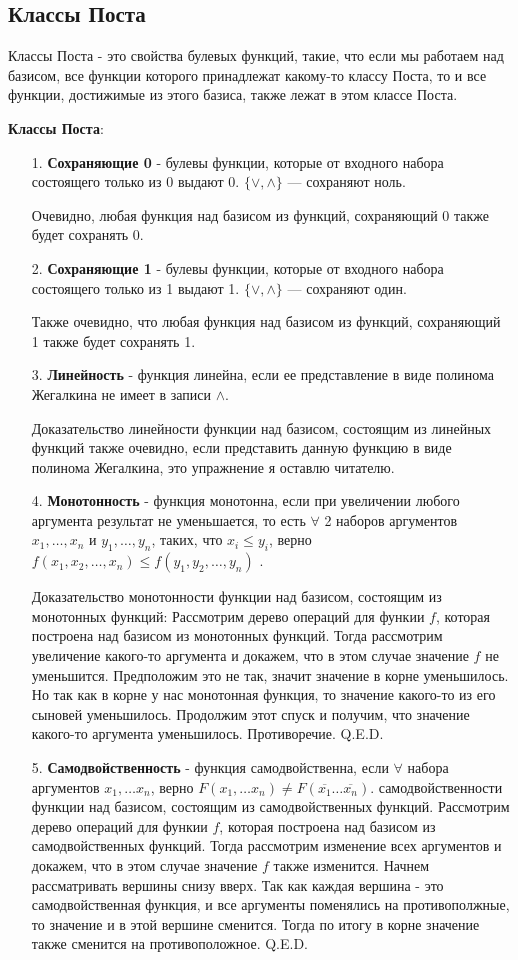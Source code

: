 \subsection{Классы Поста}
Классы Поста - это свойства булевых функций, такие, что если мы работаем над базисом, все функции которого принадлежат какому-то классу Поста, то и все функции, достижимые из этого базиса, также лежат в этом классе Поста.

\textbf{Классы Поста}:
\begin{enumerate}
    \item[1.] \textbf{Сохраняющие 0} - булевы функции, которые от входного набора состоящего только из 0 выдают 0.  $\{\vee, \wedge\}$ --- сохраняют ноль.
    
    Очевидно, любая функция над базисом из функций, сохраняющий 0 также будет сохранять 0.
    \item[2.] \textbf{Сохраняющие 1} - булевы функции, которые от входного набора состоящего только из 1 выдают 1.  $\{\vee, \wedge\}$ --- сохраняют один. 
    
    Также очевидно, что любая функция над базисом из функций, сохраняющий 1 также будет сохранять 1.
    \item[3.] \textbf{Линейность} - функция линейна, если ее представление в виде полинома Жегалкина не имеет в записи $\wedge$. 
    
    Доказательство линейности функции над базисом, состоящим из линейных функций также очевидно, если представить данную функцию в виде полинома Жегалкина, это упражнение я оставлю читателю.
    \item[4.] \textbf{Монотонность} - функция монотонна, если при увеличении любого аргумента результат не уменьшается, то есть $\forall$ 2 наборов аргументов $x_1, \ldots, x_n$ и $y_1, \ldots, y_n$, таких, что $x_i\leq y_i$, верно $f(x_1,x_2, \ldots, x_n) \leq f(y_1,y_2, \ldots, y_n)$ .
    
    Доказательство монотонности функции над базисом, состоящим из монотонных функций: Рассмотрим дерево операций для функии $f$, которая построена над базисом из монотонных функций. Тогда рассмотрим увеличение какого-то аргумента и докажем, что в этом случае значение $f$ не уменьшится. Предположим это не так, значит значение в корне уменьшилось. Но так как в корне у нас монотонная функция, то значение какого-то из его сыновей уменьшилось. Продолжим этот спуск и получим, что значение какого-то аргумента уменьшилось. Противоречие. Q.E.D. 
    \item[5.] \textbf{Самодвойственность} - функция самодвойственна, если $\forall$ набора аргументов $x_1, \ldots x_n$, верно  $F(x_1, \dots x_n)\neq F(\overline{x_1} \dots \overline{x_n})$. самодвойственности функции над базисом, состоящим из самодвойственных функций. Рассмотрим дерево операций для функии $f$, которая построена над базисом из самодвойственных функций. Тогда рассмотрим изменение всех аргументов и докажем, что в этом случае значение $f$ также изменится. Начнем рассматривать вершины снизу вверх. Так как каждая вершина - это самодвойственная функция, и все аргументы поменялись на противополжные, то значение и в этой вершине сменится. Тогда по итогу в корне значение также сменится на противоположное. Q.E.D. 
\end{enumerate}
